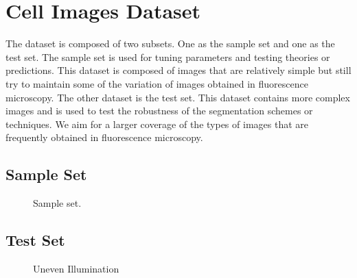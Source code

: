 
\chapter{Cell Images Dataset} %

\label{AppendixA} %

The dataset is composed of two subsets. One as the sample set and one as the test set. The sample set is used for tuning parameters and testing theories or predictions. This dataset is composed of images that are relatively simple but still try to maintain some of the variation of images obtained in fluorescence microscopy. The other dataset is the test set. This dataset contains more complex images and is used to test the robustness of the segmentation schemes or techniques. We aim for a larger coverage of the types of images that are frequently obtained in fluorescence microscopy.

\section{Sample Set}
\begin{figure}[!h]
	\centering
	\caption{Sample set.}
	\label{fig:sampleset}
\end{figure}

\clearpage
\section{Test Set}

\begin{figure}[!h]
	\centering
	\caption{Uneven Illumination}
	\label{fig:unevenillumination}
\end{figure}


